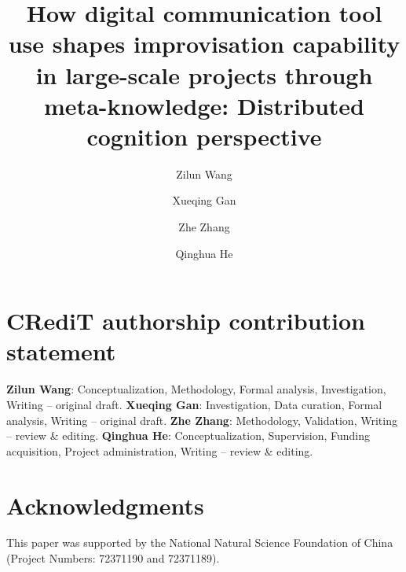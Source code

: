 \documentclass[authoryear,preprint,times,12pt]{elsarticle}
\begin{document}
\begin{frontmatter}

\title{How digital communication tool use shapes improvisation capability in large-scale projects through meta-knowledge: Distributed cognition perspective}

\author[labela]{Zilun Wang}
\author[labelb]{Xueqing Gan}
\author[labelc]{Zhe Zhang}
\author[labeld]{Qinghua He}






\end{frontmatter}

\section*{CRediT authorship contribution statement}
\textbf{Zilun Wang}: Conceptualization, Methodology, Formal analysis, Investigation, Writing -- original draft.
\textbf{Xueqing Gan}: Investigation, Data curation, Formal analysis, Writing -- original draft.
\textbf{Zhe Zhang}: Methodology, Validation, Writing -- review \& editing.
\textbf{Qinghua He}: Conceptualization, Supervision, Funding acquisition, Project administration, Writing -- review \& editing.

\section*{Acknowledgments}
This paper was supported by the National Natural Science Foundation of China (Project Numbers: 72371190 and 72371189).
\end{document}
